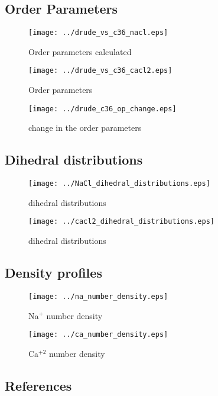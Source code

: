\documentclass[journal=jacsat,manuscript=article,layout=singlecolumn]{achemso}
\begin{document}
\subsection{Order Parameters}

\begin{figure}[!hbt]
	\centering
	\texttt{[image: ../drude\_vs\_c36\_nacl.eps]}
	\caption{Order parameters calculated}
\end{figure}
\FloatBarrier
\begin{figure}[!hbt]
	\centering
	\texttt{[image: ../drude\_vs\_c36\_cacl2.eps]}
	\caption{Order parameters}
\end{figure}
\FloatBarrier
\begin{figure}[!hbt]
	\centering
	\texttt{[image: ../drude\_c36\_op\_change.eps]}
	\caption{change in the order parameters}
\end{figure}
\FloatBarrier
\subsection{Dihedral distributions}

\begin{figure}[!hbt]
	\centering
	\texttt{[image: ../NaCl\_dihedral\_distributions.eps]}
	\caption{dihedral distributions}
\end{figure}
\FloatBarrier

\begin{figure}[!hbt]
	\centering
	\texttt{[image: ../cacl2\_dihedral\_distributions.eps]}
	\caption{dihedral distributions}
\end{figure}
\FloatBarrier

\subsection{Density profiles}

\begin{figure}[!hbt]
	\centering
	\texttt{[image: ../na\_number\_density.eps]}
	\caption{Na$^{+}$ number density}
\end{figure}
\FloatBarrier
\begin{figure}[!hbt]
	\centering
	\texttt{[image: ../ca\_number\_density.eps]}
	\caption{Ca$^{+2}$ number density}
\end{figure}
\FloatBarrier



\subsection{References}
\end{document}
